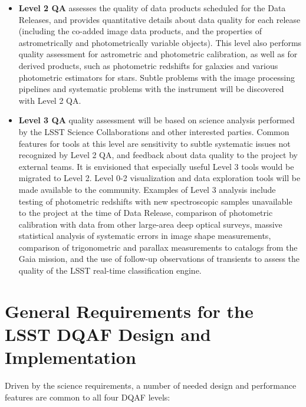 \documentclass[SE,toc,lsstdraft]{lsstdoc}
\begin{document}
\begin{itemize}
\item \textbf{Level 2 QA} assesses the quality of data products scheduled for the Data Releases,
and provides quantitative details about data quality for each release (including the co-added image
data products, and the properties of astrometrically and photometrically variable objects).
This level also performs quality assessment for astrometric and photometric calibration,
as well as for derived products, such as photometric redshifts for galaxies and
various photometric estimators for stars. Subtle problems with the image processing pipelines
and systematic problems with the instrument will be discovered with Level 2 QA.

\item \textbf{Level 3 QA} quality assessment will be based on science analysis performed
by the LSST Science Collaborations and other interested parties. Common features for
tools at this level are sensitivity to subtle systematic issues not recognized by Level 2
QA, and feedback about data quality to the project by external teams. It is envisioned
that especially useful Level 3 tools would be migrated to Level 2.  Level 0-2 visualization and data
exploration tools will be made available to the community.
Examples
of Level 3 analysis include  testing of photometric redshifts with new spectroscopic
samples unavailable to the project at the time of Data Release, comparison of photometric
calibration with data from other large-area deep optical surveys, massive statistical
analysis of systematic errors in image shape measurements, comparison of
trigonometric and parallax measurements to catalogs from the Gaia mission, and
the use of follow-up observations of transients to assess the quality of the LSST real-time
classification engine.
\end{itemize}



\section{General Requirements for the LSST DQAF Design and Implementation}

Driven by the science requirements, a number of needed design and performance features are common to all four DQAF levels:
\end{document}
